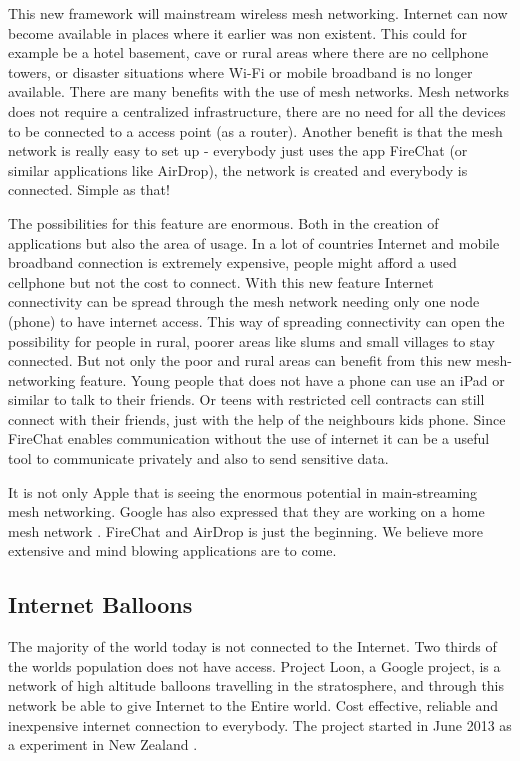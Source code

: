 This new framework will mainstream wireless mesh networking. Internet can now become available in places where it earlier was non existent. This could for example be a hotel basement, cave or rural areas where there are no cellphone towers, or disaster situations where Wi-Fi or mobile broadband  is no longer available. There are many benefits with the use of mesh networks. Mesh networks does not require a centralized infrastructure, there are no need for all the devices to be connected to a access point (as a router). Another benefit is that the mesh network is really easy to set up - everybody just uses the app FireChat (or similar applications like AirDrop), the network is created and everybody is connected. Simple as that! 

The possibilities for this feature are enormous. Both in the creation of applications but also the area of usage. In a lot of countries Internet and mobile broadband connection is extremely expensive, people might afford a used cellphone but not the cost to connect. With this new feature Internet connectivity can be spread through the mesh network needing only one node (phone) to have internet access. This way of spreading connectivity can open the possibility for people in rural, poorer areas like slums and small villages to stay connected. But not only the poor and rural areas can benefit from this new mesh-networking feature. Young people that does not have a phone can use an iPad or similar to talk to their friends. Or teens with restricted cell contracts can still connect with their friends, just with the help of the neighbours kids phone. Since FireChat enables communication without the use of internet it can be a useful tool to communicate privately and also to send sensitive data.
 
It is not only Apple that is seeing the enormous potential in main-streaming mesh networking. Google has also expressed that they are working on a home mesh network \cite{googleMesh}. FireChat and AirDrop is just the beginning. We believe more extensive and mind blowing applications are to come. 


\subsection{Internet Balloons}
The majority of the world today is not connected to the Internet. Two thirds of the worlds population does not have access. Project Loon, a Google project, is a network of high altitude balloons travelling in the stratosphere, and through this network be able to give Internet to the Entire world. Cost effective, reliable and inexpensive internet connection to everybody. The project started in June 2013 as a experiment in New Zealand \cite{loon}. 

